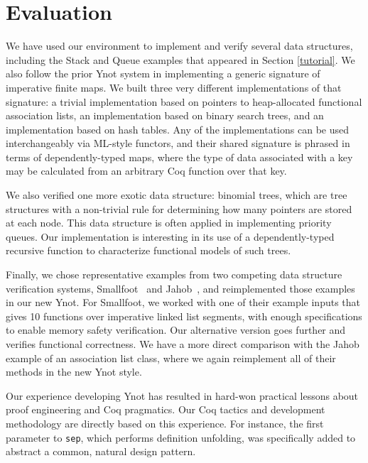 \documentclass[preprint,nocopyrightspace]{sigplanconf}
\begin{document}

\section{Evaluation}

We have used our environment to implement and verify several data
structures, including the Stack and Queue examples that appeared in
Section \ref{tutorial}.  We also follow the prior Ynot system in
implementing a generic signature of imperative finite maps.  We built
three very different implementations of that signature: a trivial
implementation based on pointers to heap-allocated functional
association lists, an implementation based on binary search trees, and
an implementation based on hash tables.  Any of the implementations
can be used interchangeably via ML-style functors, and their shared
signature is phrased in terms of dependently-typed maps, where the
type of data associated with a key may be calculated from an arbitrary
Coq function over that key.

We also verified one more exotic data structure: binomial trees, which
are tree structures with a non-trivial rule for determining how many
pointers are stored at each node.  This data structure is often
applied in implementing priority queues.  Our implementation is
interesting in its use of a dependently-typed recursive function to
characterize functional models of such trees.

Finally, we chose representative examples from two competing data
structure verification systems, Smallfoot~\cite{smallfoot} and
Jahob~\cite{jahob}, and reimplemented those examples in our new Ynot.
For Smallfoot, we worked with one of their example inputs that gives
10 functions over imperative linked list segments, with enough
specifications to enable memory safety verification.  Our alternative
version goes further and verifies functional correctness.  We have a
more direct comparison with the Jahob example of an association list
class, where we again reimplement all of their methods in the new Ynot
style.

Our experience developing Ynot has resulted in hard-won practical
lessons about proof engineering and Coq pragmatics.  Our Coq tactics
and development methodology are directly based on this experience.
For instance, the first parameter to {\tt sep}, which performs
definition unfolding, was specifically added to abstract a common,
natural design pattern.
\end{document}
